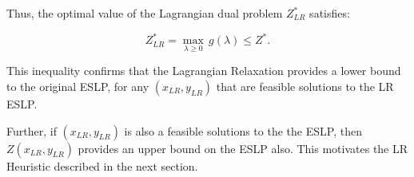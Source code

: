 Thus, the optimal value of the Lagrangian dual problem $Z_{LR}^*$ satisfies:

\begin{equation}\label{eq:lower_bound}
    Z_{LR}^* = \max_{\lambda \geq 0} \, g(\lambda) \leq Z^*.
\end{equation}

This inequality confirms that the Lagrangian Relaxation provides a lower bound to the original ESLP,
for any $(x_{LR}, y_{LR})$ that are feasible solutions to the LR ESLP.

Further, if $(x_{LR}, y_{LR})$ is also a feasible solutions to the the ESLP, then 
$Z(x_{LR}, y_{LR})$ provides an upper bound on the ESLP also. This motivates the LR Heuristic described in the next section.